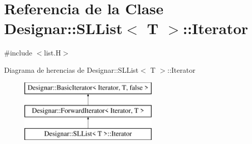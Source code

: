 \hypertarget{class_designar_1_1_s_l_list_1_1_iterator}{}\section{Referencia de la Clase Designar\+:\+:S\+L\+List$<$ T $>$\+:\+:Iterator}
\label{class_designar_1_1_s_l_list_1_1_iterator}


{\ttfamily \#include $<$list.\+H$>$}

Diagrama de herencias de Designar\+:\+:S\+L\+List$<$ T $>$\+:\+:Iterator\begin{figure}[H]
\begin{center}
\leavevmode
\includegraphics[height=3.000000cm]{class_designar_1_1_s_l_list_1_1_iterator}
\end{center}
\end{figure}
